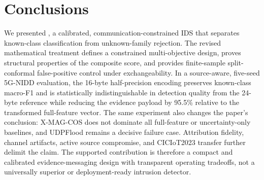 \section{Conclusions}

We presented \method{}, a calibrated, communication-constrained IDS that separates known-class classification from unknown-family rejection. The revised mathematical treatment defines a constrained multi-objective design, proves structural properties of the composite score, and provides finite-sample split-conformal false-positive control under exchangeability. In a source-aware, five-seed 5G-NIDD evaluation, the 16-byte half-precision encoding preserves known-class macro-F1 and is statistically indistinguishable in detection quality from the 24-byte reference while reducing the evidence payload by 95.5\% relative to the transformed full-feature vector. The same experiment also changes the paper's conclusion: X-MAG-COS does not dominate all full-feature or uncertainty-only baselines, and UDPFlood remains a decisive failure case. Attribution fidelity, channel artifacts, active source compromise, and CICIoT2023 transfer further delimit the claim. The supported contribution is therefore a compact and calibrated evidence-messaging design with transparent operating tradeoffs, not a universally superior or deployment-ready intrusion detector.





